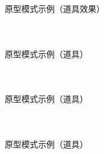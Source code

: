 \documentclass[UTF8,aspectratio=169]{beamer}
\begin{document}
\begin{frame}{原型模式示例（道具效果）}
    \begin{columns}
        \begin{column}{0.48\textwidth}
            \inputminted[firstline=58, lastline=75]{cpp}{code/prototype_pattern.cpp}
        \end{column}
        \begin{column}{0.48\textwidth}
            \inputminted[firstline=77, lastline=97]{cpp}{code/prototype_pattern.cpp}
        \end{column}
    \end{columns}
\end{frame}

\begin{frame}{原型模式示例（道具）}
    \begin{columns}
        \begin{column}{0.48\textwidth}
            \inputminted[firstline=99, lastline=118]{cpp}{code/prototype_pattern.cpp}
        \end{column}
        \begin{column}{0.48\textwidth}
            \inputminted[firstline=119, lastline=136]{cpp}{code/prototype_pattern.cpp}
        \end{column}
    \end{columns}
\end{frame}

\begin{frame}{原型模式示例（道具）}
    \begin{columns}
        \begin{column}{0.48\textwidth}
            \inputminted[firstline=138, lastline=150]{cpp}{code/prototype_pattern.cpp}
        \end{column}
        \begin{column}{0.48\textwidth}
            \inputminted[firstline=151, lastline=167]{cpp}{code/prototype_pattern.cpp}
        \end{column}
    \end{columns}
\end{frame}

\begin{frame}{原型模式示例（道具）}
    \begin{columns}
        \begin{column}{0.48\textwidth}
            \inputminted[firstline=167, lastline=181]{cpp}{code/prototype_pattern.cpp}
        \end{column}
        \begin{column}{0.48\textwidth}
            \inputminted[firstline=182, lastline=198]{cpp}{code/prototype_pattern.cpp}
        \end{column}
    \end{columns}
\end{frame}
\end{document}
